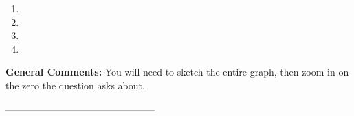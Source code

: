 \documentclass{extbook}[14pt]
\begin{document}
\begin{enumerate}[label=\Alph*.] 
\item   
\item   
\item   
\item   
\end{enumerate} 
 
\textbf{General Comments:} You will need to sketch the entire graph, then zoom in on the zero the question asks about.

-----------------------------------------------
\end{document}
